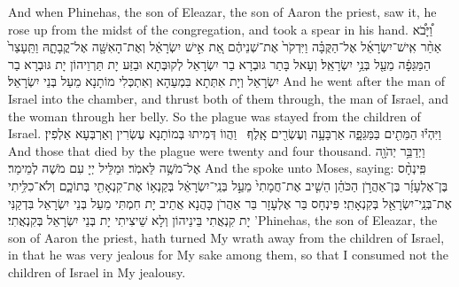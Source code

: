 {And when Phinehas, the son of Eleazar, the son of Aaron the priest, saw it, he rose up from the midst of the congregation, and took a spear in his hand.}{}
{וַ֠יָּבֹ֠א אַחַ֨ר אִֽישׁ־יִשְׂרָאֵ֜ל אֶל־הַקֻּבָּ֗ה וַיִּדְקֹר֙ אֶת־שְׁנֵיהֶ֔ם אֵ֚ת אִ֣ישׁ יִשְׂרָאֵ֔ל וְאֶת־הָאִשָּׁ֖ה אֶל־קֳבָתָ֑הּ וַתֵּֽעָצַר֙ הַמַּגֵּפָ֔ה מֵעַ֖ל בְּנֵ֥י יִשְׂרָאֵֽל׃
}
{וְעָאל בָּתַר גּוּבְרָא בַר יִשְׂרָאֵל לְקוּבְּתָא וּבַזַּע יָת תַּרְוֵיהוֹן יָת גּוּבְרָא בַר יִשְׂרָאֵל וְיָת אִתְּתָא בִּמְעַהָא וְאִתְכְּלִי מוֹתָנָא מֵעַל בְּנֵי יִשְׂרָאֵל׃}
{And he went after the man of Israel into the chamber, and thrust both of them through, the man of Israel, and the woman through her belly. So the plague was stayed from the children of Israel.}{}
{וַיִּהְי֕וּ הַמֵּתִ֖ים בַּמַּגֵּפָ֑ה אַרְבָּעָ֥ה וְעֶשְׂרִ֖ים אָֽלֶף׃ \petucha }
{וַהֲווֹ דְּמִיתוּ בְּמוֹתָנָא עֶשְׂרִין וְאַרְבְּעָא אַלְפִין׃}
{And those that died by the plague were twenty and four thousand.}{}
{וַיְדַבֵּ֥ר יְהֹוָ֖ה אֶל־מֹשֶׁ֥ה לֵּאמֹֽר׃}
{וּמַלֵּיל יְיָ עִם מֹשֶׁה לְמֵימַר׃}
{And the \lord\space spoke unto Moses, saying:}{}
{פִּֽינְחָ֨ס בֶּן־אֶלְעָזָ֜ר בֶּן־אַהֲרֹ֣ן הַכֹּהֵ֗ן הֵשִׁ֤יב אֶת־חֲמָתִי֙ מֵעַ֣ל בְּנֵֽי־יִשְׂרָאֵ֔ל בְּקַנְא֥וֹ אֶת־קִנְאָתִ֖י בְּתוֹכָ֑ם וְלֹא־כִלִּ֥יתִי אֶת־בְּנֵֽי־יִשְׂרָאֵ֖ל בְּקִנְאָתִֽי׃
}
{פִּינְחָס בַּר אֶלְעָזָר בַּר אַהֲרֹן כָּהֲנָא אֲתֵיב יָת חִמְתִּי מֵעַל בְּנֵי יִשְׂרָאֵל בִּדְקַנִּי יָת קִנְאֲתִי בֵּינֵיהוֹן וְלָא שֵׁיצִיתִי יָת בְּנֵי יִשְׂרָאֵל בְּקִנְאֲתִי׃}
{’Phinehas, the son of Eleazar, the son of Aaron the priest, hath turned My wrath away from the children of Israel, in that he was very jealous for My sake among them, so that I consumed not the children of Israel in My jealousy.}{}
